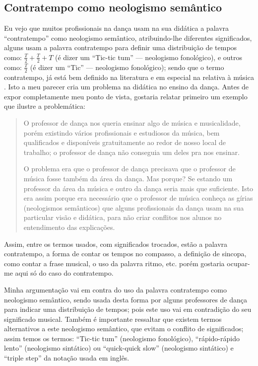 \subsection{Contratempo como neologismo semântico}
Eu vejo que muitos profissionais na dança usam na sua didática a palavra ``contratempo'' como neologismo semântico, 
atribuindo-lhe diferentes significados, 
alguns usam a palavra contratempo para definir uma distribuição de tempos como: 
$\frac{T}{2}+\frac{T}{2}+T$ (é dizer um ``Tic-tic tum'' --- neologismo fonológico), 
e outros como: $\frac{T}{2}$ (é dizer um ``Tic'' --- neologismo fonológico); 
sendo que o termo contratempo, 
já está bem definido na literatura \cite{priberamcontratempo} e em especial na relativa à música \cite[pp. 46]{alves2004teoria}.
Isto a meu parecer cria um problema na didática no ensino da dança. 
Antes de expor completamente meu ponto de vista, gostaria relatar primeiro um exemplo que ilustre a problemática: 
\begin{quotation}
O professor de dança nos queria ensinar algo de música e musicalidade, 
porém existindo vários profissionais e estudiosos da música, 
bem qualificados e disponíveis gratuitamente ao redor de nosso local de trabalho; 
o professor de dança não conseguia um deles pra nos ensinar.

O problema era que o professor de dança precisava que o professor de música fosse também da área da dança. 
Mas porque? Se estando um professor da área da música e outro da dança seria mais que suficiente.
Isto era assim porque era necessário que o professor de música
conheça as gírias (neologismos semânticos) que alguns profissionais da dança usam na sua particular visão e didática, 
para não criar conflitos nos alunos no entendimento das explicações. 
\end{quotation}
Assim, entre os termos usados, com significados trocados, estão a palavra contratempo, 
a forma de contar os tempos no compasso, a definição de sincopa, como contar a frase musical,
o uso da palavra ritmo, etc. 
porém gostaria ocupar-me aqui só do caso do contratempo. 

Minha argumentação vai em contra do uso da palavra contratempo como neologismo semântico, 
sendo usada desta forma por alguns professores de dança
para indicar uma distribuição de tempos; pois este uso vai em contradição do seu significado musical. 
Também é importante ressaltar que existem termos alternativos a este neologismo semântico, 
que evitam o conflito de significados; 
assim temos os termos: ``Tic-tic tum'' (neologismo fonológico), 
``rápido-rápido lento'' (neologismo sintático) ou ``quick-quick slow'' (neologismo sintático) e ``triple step'' da notação usada em inglês.


